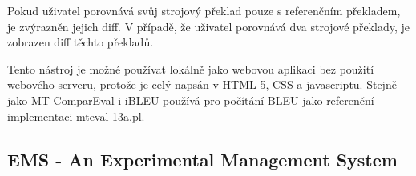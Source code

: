 Pokud uživatel porovnává svůj strojový překlad pouze s referenčním překladem,
  je zvýrazněn jejich diff.
V případě, že uživatel porovnává dva strojové překlady,
  je zobrazen diff těchto překladů.

Tento nástroj je možné používat lokálně jako webovou aplikaci bez použití webového serveru,
  protože je celý napsán v HTML 5, CSS a javascriptu.
Stejně jako MT-ComparEval i iBLEU používá pro počítání BLEU jako referenční implementaci mteval-13a.pl.

\subsection{EMS - An Experimental Management System}

